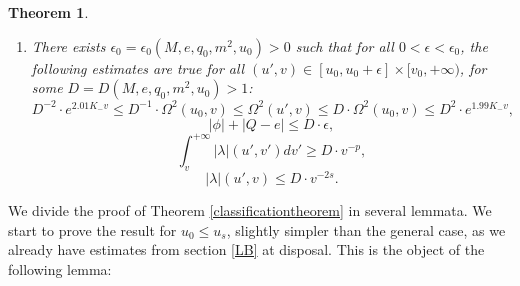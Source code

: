 \documentclass[10pt,a4paper]{article}
\theoremstyle{plain}
\newtheorem{thm}{Theorem}[section]
\theoremstyle{remark}
\theoremstyle{definition}
\theoremstyle{plain}
\theoremstyle{remark}
\theoremstyle{definition}
\numberwithin{equation}{section}
\begin{document}
\begin{thm}
\begin{enumerate}
\begin{equation}
		|\partial_v \log(\Omega^2)(u',v)-2K_-|\leq  C \cdot v^{1-2s},
		\end{equation} \begin{equation} \label{rigidity9}
		|\kappa^{-1}(u,v)-1| \leq  C \cdot v^{1-2s},
		\end{equation} \begin{equation} \label{rigidity10}
		|\varpi(u,v)-M| \leq  C \cdot v^{1-2s},
		\end{equation}
		\begin{equation} \label{rigidity11}
		|\lambda|(u',v) \leq  C \cdot v^{-2s},	\end{equation}
		\begin{equation} \label{rigidity12}
		\int_{v}^{+\infty}	|\lambda|(u',v') dv' \geq  C \cdot  v^{-p}\end{equation}
		\begin{equation} \label{rigidity13}
		|\nu|(u',v)\leq  C \cdot \Omega^2(u',v) \leq C^2 \cdot e^{1.99K_- v}. 			\end{equation}
		
		\item There exists $\epsilon_0=\epsilon_0(M,e,q_0,m^2,u_0)>0$ such that for all $0<\epsilon<\epsilon_0$, the following estimates are true for all $(u',v) \in [u_0,u_0+\epsilon] \times [v_0,+\infty)$, for some $D=D(M,e,q_0,m^2,u_0)>1$: \begin{equation}\label{rigidity14}
		D^{-2} \cdot e^{2.01K_- v} \leq  D^{-1} \cdot \Omega^2(u_0,v)\leq 	\Omega^2(u',v) \leq D \cdot \Omega^2(u_0,v)  \leq   D^2\cdot e^{1.99K_- v},  \end{equation} \begin{equation}\label{rigidity15}
		|\phi|+|Q-e| \leq D \cdot \epsilon ,  \end{equation}
		\begin{equation} \label{rigidity16}
		\int_{v}^{+\infty}	|\lambda|(u',v') dv' \geq  D \cdot  v^{-p},\end{equation}  \begin{equation} \label{rigidity17}
		|\lambda|(u',v) \leq   D \cdot  v^{-2s}.\end{equation}	\end{enumerate}
\end{thm}

We divide the proof of Theorem \ref{classificationtheorem} in several lemmata. We start to prove the result for $u_0 \leq u_s$, slightly simpler than the general case, as we already have estimates from section \ref{LB} at disposal. This is the object of the following lemma:
\end{document}
